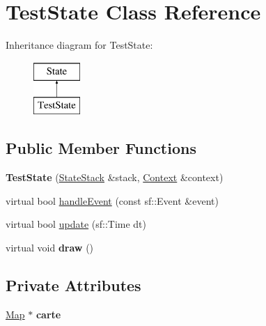 \hypertarget{classTestState}{\section{\-Test\-State \-Class \-Reference}
\label{classTestState}
}
\-Inheritance diagram for \-Test\-State\-:\begin{figure}[H]
\begin{center}
\leavevmode
\includegraphics[height=2.000000cm]{classTestState}
\end{center}
\end{figure}
\subsection*{\-Public \-Member \-Functions}
\begin{DoxyCompactItemize}
\item 
\hypertarget{classTestState_a88a30c86aefe8e7631b1fef5b63d2c9a_a88a30c86aefe8e7631b1fef5b63d2c9a}{{\bfseries \-Test\-State} (\hyperlink{classStateStack}{\-State\-Stack} \&stack, \hyperlink{classContext}{\-Context} \&context)}\label{classTestState_a88a30c86aefe8e7631b1fef5b63d2c9a_a88a30c86aefe8e7631b1fef5b63d2c9a}

\item 
virtual bool \hyperlink{classTestState_a4035262de8411c2f8e2d12980cff089b_a4035262de8411c2f8e2d12980cff089b}{handle\-Event} (const sf\-::\-Event \&event)
\item 
virtual bool \hyperlink{classTestState_affddb89d007d492d4317dbfd1a920b96_affddb89d007d492d4317dbfd1a920b96}{update} (sf\-::\-Time dt)
\item 
\hypertarget{classTestState_af4baacd03a87b3a8abbf8e9fe0e989a4_af4baacd03a87b3a8abbf8e9fe0e989a4}{virtual void {\bfseries draw} ()}\label{classTestState_af4baacd03a87b3a8abbf8e9fe0e989a4_af4baacd03a87b3a8abbf8e9fe0e989a4}

\end{DoxyCompactItemize}
\subsection*{\-Private \-Attributes}
\begin{DoxyCompactItemize}
\item 
\hypertarget{classTestState_a58a5123af76eca1d1c90fe2aca4be2d3_a58a5123af76eca1d1c90fe2aca4be2d3}{\hyperlink{classMap}{\-Map} $\ast$ {\bfseries carte}}\label{classTestState_a58a5123af76eca1d1c90fe2aca4be2d3_a58a5123af76eca1d1c90fe2aca4be2d3}

\end{DoxyCompactItemize}



